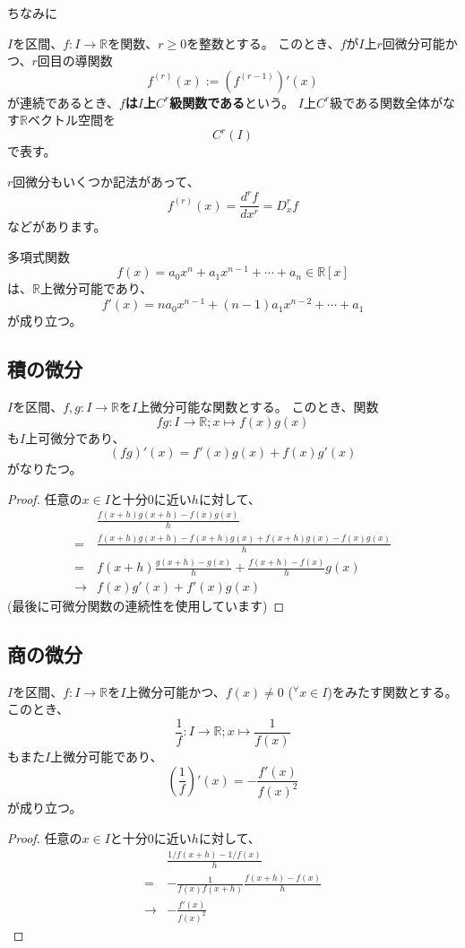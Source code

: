 ちなみに
\begin{definition}
  $I$を区間、$f:I\to\mathbb{R}$を関数、$r\geq0$を整数とする。
  このとき、$f$が$I$上$r$回微分可能かつ、$r$回目の導関数
  \[
    f^{(r)}(x):=(f^{(r-1)})'(x)
  \]
  が連続であるとき、\textbf{$f$は$I$上$C^r$級関数である}という。
  $I$上$C^r$級である関数全体がなす$\mathbb{R}$ベクトル空間を
  \[
    C^r(I)
  \]
  で表す。
\end{definition}
$r$回微分もいくつか記法があって、
\[
  f^{(r)}(x)=\frac{d^rf}{dx^r}=D_x^rf
\]
などがあります。

\begin{example}
  多項式関数
  \[
    f(x)=a_0x^n+a_1x^{n-1}+\cdots+a_n\in\mathbb{R}[x]
  \]
  は、$\mathbb{R}$上微分可能であり、
  \[
    f'(x)=na_0x^{n-1}+(n-1)a_1x^{n-2}+\cdots+a_1
  \]
  が成り立つ。
\end{example}

\subsection{積の微分}

\begin{theorem}
  $I$を区間、$f,g:I\to\mathbb{R}$を$I$上微分可能な関数とする。
  このとき、関数
  \[
    fg:I\to\mathbb{R};x\mapsto f(x)g(x)
  \]
  も$I$上可微分であり、
  \[
    (fg)'(x)=f'(x)g(x)+f(x)g'(x)
  \]
  がなりたつ。
\end{theorem}
\begin{proof}
  任意の$x\in I$と十分0に近い$h$に対して、
  \begin{align*}
    &\frac{f(x+h)g(x+h)-f(x)g(x)}{h}\\
    =&\frac{f(x+h)g(x+h)-f(x+h)g(x)+f(x+h)g(x)-f(x)g(x)}{h}\\
    =&f(x+h)\frac{g(x+h)-g(x)}{h}+\frac{f(x+h)-f(x)}{h}g(x)\\
    \to&f(x)g'(x)+f'(x)g(x)
  \end{align*}
  (最後に可微分関数の連続性を使用しています)
\end{proof}

\subsection{商の微分}

\begin{theorem}
  $I$を区間、$f:I\to\mathbb{R}$を$I$上微分可能かつ、$f(x)\neq0$ (${}^\forall x\in I$)をみたす関数とする。
  このとき、
  \[
    \frac{1}{f}:I\to\mathbb{R};x\mapsto\frac{1}{f(x)}
  \]
  もまた$I$上微分可能であり、
  \[
    \left(\frac{1}{f}\right)'(x)=-\frac{f'(x)}{f(x)^2}
  \]
  が成り立つ。
\end{theorem}
\begin{proof}
  任意の$x\in I$と十分0に近い$h$に対して、
  \begin{align*}
    &\frac{1/f(x+h)-1/f(x)}{h}\\
    =&-\frac{1}{f(x)f(x+h)}\frac{f(x+h)-f(x)}{h}\\
    \to&-\frac{f'(x)}{f(x)^2}
  \end{align*}
\end{proof}

